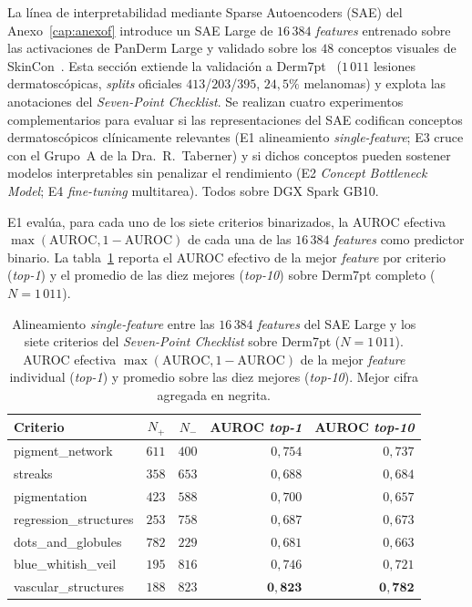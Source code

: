 La línea de interpretabilidad mediante Sparse Autoencoders (SAE) del
Anexo~\ref{cap:anexof} introduce un SAE Large de $16\,384$
\emph{features} entrenado sobre las activaciones de PanDerm Large y
validado sobre los $48$ conceptos visuales de SkinCon~\cite{skincon}.
Esta sección extiende la validación a Derm7pt~\cite{kawahara2019}
($1\,011$ lesiones dermatoscópicas, \emph{splits} oficiales
$413$/$203$/$395$, $24{,}5\%$ melanomas) y explota las anotaciones del
\emph{Seven-Point Checklist}. Se realizan cuatro experimentos
complementarios para evaluar si las representaciones del SAE codifican
conceptos dermatoscópicos clínicamente relevantes (E1 alineamiento
\emph{single-feature}; E3 cruce con el Grupo~A de la Dra.~R.~Taberner) y
si dichos conceptos pueden sostener modelos interpretables sin penalizar
el rendimiento (E2 \emph{Concept Bottleneck Model}; E4 \emph{fine-tuning}
multitarea). Todos sobre DGX Spark GB10.

E1 evalúa, para cada uno de los siete criterios binarizados, la AUROC
efectiva $\max(\mathrm{AUROC}, 1-\mathrm{AUROC})$ de cada una de las
$16\,384$ \emph{features} como predictor binario. La
tabla~\ref{tab:sae-d7pt-e1} reporta el AUROC efectivo de la mejor
\emph{feature} por criterio (\emph{top-1}) y el promedio de las diez
mejores (\emph{top-10}) sobre Derm7pt completo ($N = 1\,011$).

\begin{table}[H]
\centering
\footnotesize
\setlength{\tabcolsep}{4pt}
\renewcommand{\arraystretch}{0.95}
\caption{Alineamiento \emph{single-feature} entre las
$16\,384$ \emph{features} del SAE Large y los siete criterios
del \emph{Seven-Point Checklist} sobre Derm7pt
($N = 1\,011$). AUROC efectiva
$\max(\mathrm{AUROC}, 1-\mathrm{AUROC})$ de la mejor
\emph{feature} individual (\emph{top-1}) y promedio sobre las
diez mejores (\emph{top-10}). Mejor cifra agregada en negrita.}
\label{tab:sae-d7pt-e1}
\begin{tabular}{lrrrr}
\hline
Criterio                 & $N_{+}$ & $N_{-}$ & AUROC \emph{top-1} & AUROC \emph{top-10} \\
\hline
pigment\_network         & $611$ & $400$ & $0{,}754$ & $0{,}737$ \\
streaks                  & $358$ & $653$ & $0{,}688$ & $0{,}684$ \\
pigmentation             & $423$ & $588$ & $0{,}700$ & $0{,}657$ \\
regression\_structures   & $253$ & $758$ & $0{,}687$ & $0{,}673$ \\
dots\_and\_globules      & $782$ & $229$ & $0{,}681$ & $0{,}663$ \\
blue\_whitish\_veil      & $195$ & $816$ & $0{,}746$ & $0{,}721$ \\
vascular\_structures     & $188$ & $823$ & $\mathbf{0{,}823}$ & $\mathbf{0{,}782}$ \\
\hline
\end{tabular}
\end{table}


